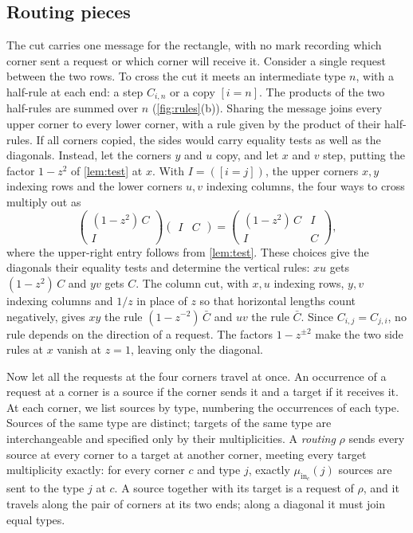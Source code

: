 \documentclass[11pt]{article}
\theoremstyle{definition}
\theoremstyle{definition}
\theoremstyle{remark}
\newcommand{\inn}{\mathrm{in}}
\begin{document}
\subsection{Routing pieces}

The cut carries one message for the rectangle, with no mark recording which corner sent a request or which corner will receive it. Consider a single request between the two rows. To cross the cut it meets an intermediate type $n$, with a half-rule at each end: a step $C_{i,n}$ or a copy $[i=n]$. The products of the two half-rules are summed over $n$ (\cref{fig:rules}(b)). Sharing the message joins every upper corner to every lower corner, with a rule given by the product of their half-rules. If all corners copied, the sides would carry equality tests as well as the diagonals. Instead, let the corners $y$ and $u$ copy, and let $x$ and $v$ step, putting the factor $1-z^2$ of \cref{lem:test} at $x$. With $I=([i=j])$, the upper corners $x,y$ indexing rows and the lower corners $u,v$ indexing columns, the four ways to cross multiply out as
\begin{equation}\label{eq:rules}
\begin{pmatrix}(1-z^2)\,C\\ I\end{pmatrix}\begin{pmatrix}I&C\end{pmatrix}=\begin{pmatrix}(1-z^2)\,C&I\\ I&C\end{pmatrix},
\end{equation}
where the upper-right entry follows from \cref{lem:test}. These choices give the diagonals their equality tests and determine the vertical rules: $xu$ gets $(1-z^2)\,C$ and $yv$ gets $C$. The column cut, with $x,u$ indexing rows, $y,v$ indexing columns and $1/z$ in place of $z$ so that horizontal lengths count negatively, gives $xy$ the rule $(1-z^{-2})\,\bar C$ and $uv$ the rule $\bar C$. Since $C_{i,j}=C_{j,i}$, no rule depends on the direction of a request. The factors $1-z^{\pm2}$ make the two side rules at $x$ vanish at $z=1$, leaving only the diagonal.

Now let all the requests at the four corners travel at once. An occurrence of a request at a corner is a source if the corner sends it and a target if it receives it. At each corner, we list sources by type, numbering the occurrences of each type. Sources of the same type are distinct; targets of the same type are interchangeable and specified only by their multiplicities. A \emph{routing} $\rho$ sends every source at every corner to a target at another corner, meeting every target multiplicity exactly: for every corner $c$ and type $j$, exactly $\mu_{\inn_c}(j)$ sources are sent to the type $j$ at $c$. A source together with its target is a request of $\rho$, and it travels along the pair of corners at its two ends; along a diagonal it must join equal types.
\end{document}
